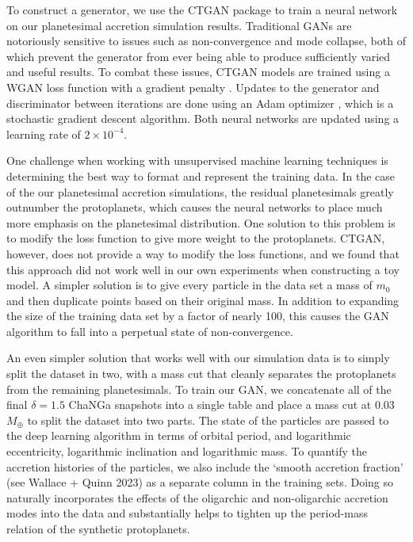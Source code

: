 To construct a generator, we use the {\sc CTGAN} \cite{xu19} package to train a neural network on our planetesimal accretion simulation results. Traditional GANs are notoriously sensitive to issues such as non-convergence and mode collapse, both of which prevent the generator from ever being able to produce sufficiently varied and useful results. To combat these issues, {\sc CTGAN} models are trained using a WGAN loss function with a gradient penalty \cite{gulrajani17}. Updates to the generator and discriminator between iterations are done using an Adam optimizer \cite{kingma14}, which is a stochastic gradient descent algorithm. Both neural networks are updated using a learning rate of $2 \times 10^{-4}$.

One challenge when working with unsupervised machine learning techniques is determining the best way to format and represent the training data. In the case of the our planetesimal accretion simulations, the residual planetesimals greatly outnumber the protoplanets, which causes the neural networks to place much more emphasis on the planetesimal distribution. One solution to this problem is to modify the loss function to give more weight to the protoplanets. {\sc CTGAN}, however, does not provide a way to modify the loss functions, and we found that this approach did not work well in our own experiments when constructing a toy model. A simpler solution is to give every particle in the data set a mass of $m_{0}$ and then duplicate points based on their original mass. In addition to expanding the size of the training data set by a factor of nearly 100, this causes the GAN algorithm to fall into a perpetual state of non-convergence.

An even simpler solution that works well with our simulation data is to simply split the dataset in two, with a mass cut that cleanly separates the protoplanets from the remaining planetesimals. To train our GAN, we concatenate all of the final $\delta = 1.5$ {\sc ChaNGa} snapshots into a single table and place a mass cut at 0.03 $M_{\oplus}$ to split the dataset into two parts. The state of the particles are passed to the deep learning algorithm in terms of orbital period, and logarithmic eccentricity, logarithmic inclination and logarithmic mass. To quantify the accretion histories of the particles, we also include the `smooth accretion fraction' (see Wallace + Quinn 2023) as a separate column in the training sets. Doing so naturally incorporates the effects of the oligarchic and non-oligarchic accretion modes into the data and substantially helps to tighten up the period-mass relation of the synthetic protoplanets.

